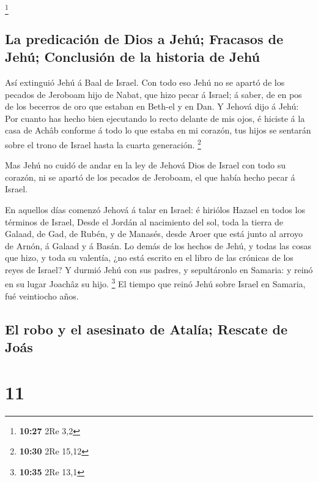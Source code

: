 \footnote{\textbf{10:27} 2Re 3,2}

\hypertarget{la-predicaciuxf3n-de-dios-a-jehuxfa-fracasos-de-jehuxfa-conclusiuxf3n-de-la-historia-de-jehuxfa}{%
\subsection{La predicación de Dios a Jehú; Fracasos de Jehú; Conclusión
de la historia de
Jehú}\label{la-predicaciuxf3n-de-dios-a-jehuxfa-fracasos-de-jehuxfa-conclusiuxf3n-de-la-historia-de-jehuxfa}}

 Así extinguió Jehú á Baal de Israel.  Con
todo eso Jehú no se apartó de los pecados de Jeroboam hijo de Nabat, que
hizo pecar á Israel; á saber, de en pos de los becerros de oro que
estaban en Beth-el y en Dan.  Y Jehová dijo á Jehú: Por
cuanto has hecho bien ejecutando lo recto delante de mis ojos, é hiciste
á la casa de Achâb conforme á todo lo que estaba en mi corazón, tus
hijos se sentarán sobre el trono de Israel hasta la cuarta generación.
\footnote{\textbf{10:30} 2Re 15,12}

 Mas Jehú no cuidó de andar en la ley de Jehová Dios de
Israel con todo su corazón, ni se apartó de los pecados de Jeroboam, el
que había hecho pecar á Israel.

 En aquellos días comenzó Jehová á talar en Israel: é
hiriólos Hazael en todos los términos de Israel,  Desde el
Jordán al nacimiento del sol, toda la tierra de Galaad, de Gad, de
Rubén, y de Manasés, desde Aroer que está junto al arroyo de Arnón, á
Galaad y á Basán.  Lo demás de los hechos de Jehú, y todas
las cosas que hizo, y toda su valentía, ¿no está escrito en el libro de
las crónicas de los reyes de Israel?  Y durmió Jehú con sus
padres, y sepultáronlo en Samaria: y reinó en su lugar Joachâz su hijo.
\footnote{\textbf{10:35} 2Re 13,1}  El tiempo que reinó
Jehú sobre Israel en Samaria, fué veintiocho años.

\hypertarget{el-robo-y-el-asesinato-de-ataluxeda-rescate-de-jouxe1s}{%
\subsection{El robo y el asesinato de Atalía; Rescate de
Joás}\label{el-robo-y-el-asesinato-de-ataluxeda-rescate-de-jouxe1s}}

\hypertarget{section-10}{%
\section{11}\label{section-10}}

